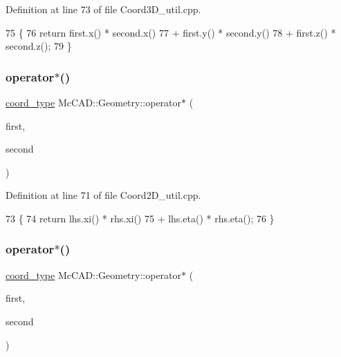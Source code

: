 Definition at line 73 of file Coord3\+D\+\_\+util.\+cpp.


\begin{DoxyCode}
75                               \{
76     \textcolor{keywordflow}{return} first.x() * second.x()
77             + first.y() * second.y()
78             + first.z() * second.z();
79 \}
\end{DoxyCode}
\mbox{\label{namespaceMcCAD_1_1Geometry_af732040158a40b445fdc178d216186b3}} 
\subsubsection{\texorpdfstring{operator$\ast$()}{operator*()}\hspace{0.1cm}{\footnotesize\ttfamily [8/9]}}
{\footnotesize\ttfamily \hyperlink{namespaceMcCAD_1_1Geometry_ac043b37a4a7e849fca22869e1982d2f8}{coord\+\_\+type} Mc\+C\+A\+D\+::\+Geometry\+::operator$\ast$ (\begin{DoxyParamCaption}\item[{const \hyperlink{classMcCAD_1_1Geometry_1_1Coord2D}{Coord2D} \&}]{first,  }\item[{const \hyperlink{classMcCAD_1_1Geometry_1_1Coord2D}{Coord2D} \&}]{second }\end{DoxyParamCaption})}



Definition at line 71 of file Coord2\+D\+\_\+util.\+cpp.


\begin{DoxyCode}
73                            \{
74     \textcolor{keywordflow}{return} lhs.xi() * rhs.xi()
75             + lhs.eta() * rhs.eta();
76 \}
\end{DoxyCode}
\mbox{\label{namespaceMcCAD_1_1Geometry_ab6f9e617eb18c983b495d29a1d54c486}} 
\subsubsection{\texorpdfstring{operator$\ast$()}{operator*()}\hspace{0.1cm}{\footnotesize\ttfamily [9/9]}}
{\footnotesize\ttfamily \hyperlink{namespaceMcCAD_1_1Geometry_ac043b37a4a7e849fca22869e1982d2f8}{coord\+\_\+type} Mc\+C\+A\+D\+::\+Geometry\+::operator$\ast$ (\begin{DoxyParamCaption}\item[{const \hyperlink{classMcCAD_1_1Geometry_1_1Coord}{Coord} \&}]{first,  }\item[{const \hyperlink{classMcCAD_1_1Geometry_1_1Coord}{Coord} \&}]{second }\end{DoxyParamCaption})}



